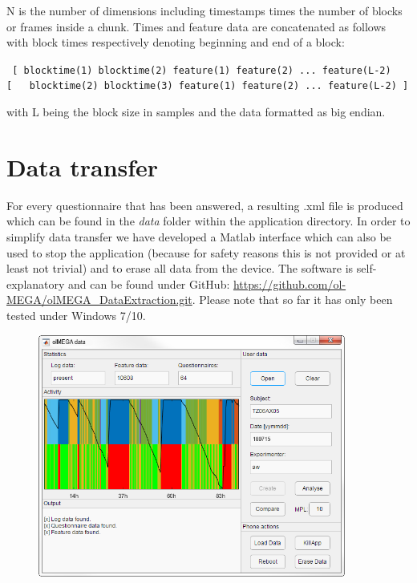 \documentclass[11pt,a4paper,titlepage]{article}
\begin{document}
N is the number of dimensions including timestamps times the number of blocks or frames inside a chunk. Times and feature data are concatenated as follows with block times respectively denoting beginning and end of a block:\\

\begin{tcolorbox}[colback=black!10!white,colframe=black!50!white, boxsep=1pt,left=4pt,right=4pt,top=4pt,bottom=2pt]
	\texttt{
		[ blocktime(1) blocktime(2) feature(1) feature(2) ... feature(L-2)\\
		\color{black!10!white}[\ \ \color{black} blocktime(2) blocktime(3) feature(1) feature(2) ... feature(L-2) ]
	}
\end{tcolorbox}
\vspace{0.5cm}
with L being the block size in samples and the data formatted as big endian.


\clearpage


\section{Data transfer}\label{sec:transfer}

For every questionnaire that has been answered, a resulting .xml file is produced which can be found in the \textit{data} folder within the application directory. In order to simplify data transfer we have developed a Matlab interface which can also be used to stop the application (because for safety reasons this is not provided or at least not trivial) and to erase all data from the device. The software is self-explanatory and can be found under GitHub: \url{https://github.com/ol-MEGA/olMEGA_DataExtraction.git}. Please note that so far it has only been tested under Windows 7/10.

\begin{figure}[h]
	\centering
		\includegraphics[width=0.90\textwidth]{images/DataExtractor.png}
	\label{fig:DataExtractor}
\end{figure}
\end{document}
